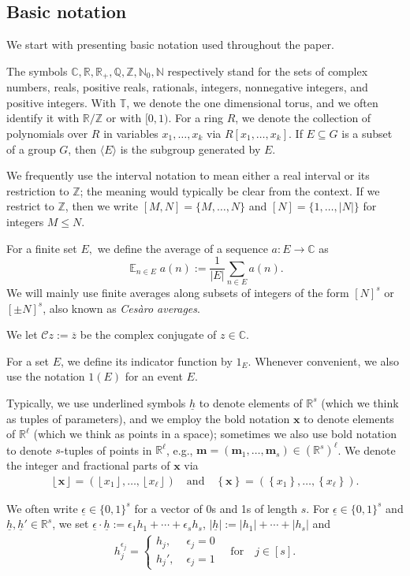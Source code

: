 \documentclass[11pt]{amsart}
\theoremstyle{definition}
\DeclareMathOperator*{\E}{\mathbb{E}}
\newcommand{\C}{{\mathbb C}}
\newcommand{\N}{{\mathbb N}}
\newcommand{\Q}{{\mathbb Q}}
\newcommand{\R}{{\mathbb R}}
\newcommand{\T}{{\mathbb T}}
\newcommand{\Z}{{\mathbb Z}}
\newcommand{\CC}{{\mathcal C}}
\newcommand{\bm}{{\mathbf{m}}}
\newcommand{\bx}{{\mathbf{x}}}
\newcommand{\uh}{{\underline{h}}}
\newcommand{\eps}{\epsilon}
\newcommand{\ueps}{{\underline{\epsilon}}}
\newcommand{\1}{{\mathbf{1}}}
\newcommand{\abs}[1]{\mathopen{}\left| #1\mathclose{}\right|}
\newcommand{\floor}[1]{{\left \lfloor #1 \right \rfloor}}
\newcommand{\rem}[1]{\left \{ #1 \right \}}
\begin{document}
\subsection{Basic notation}\label{SS:notation}
We start with presenting basic notation used throughout the paper.

The symbols $\C, \R, \R_+, \Q, \Z, \N_0, \N$ respectively stand for the sets of complex numbers, reals, positive reals, rationals, integers, nonnegative integers, and positive integers. With $\T$, we denote the one dimensional torus, and we often identify it with $\R/\Z$ or  with $[0,1)$. For a ring $R$, we denote the collection of polynomials over $R$ in variables $x_1, \ldots, x_k$ via $R[x_1, \ldots, x_k]$. If $E\subseteq G$ is a subset of a group $G$, then $\langle E \rangle$ is the subgroup generated by $E$.

We frequently use the interval notation to mean either a real interval or its restriction to $\Z$; the meaning would typically be clear from the context. If we restrict to $\Z$, then we write $[M,N] = \{M, \ldots, N\}$ and $[N]=\{1, \ldots, |N|\}$ for integers $M\leq N$.


For a finite set $E,$ we define the average of a sequence $a:E\to \C$ as 
\[\E_{n\in E}a(n) :=\frac{1}{|E|}\sum_{n\in E}a(n).\] We will mainly use finite averages along subsets of integers of the form $[N]^s$ or $[\pm N]^s$, also known as \textit{Ces\`aro averages}.

We let $\CC z := \overline{z}$ be the complex conjugate of $z\in \C$.

For a set $E$, we define its indicator function by $1_E$. Whenever convenient, we also use the notation $1(E)$ for an event $E$.


Typically, we use underlined symbols $\uh$ to denote elements of $\R^s$ (which we think as tuples of parameters), and we employ the bold notation $\bx$ to denote elements of $\R^\ell$ (which we think as points in a space); sometimes we also use bold notation to denote $s$-tuples of points in $\R^\ell$, e.g., $\bm=(\bm_1, \ldots, \bm_s)\in(\R^s)^\ell$. We denote the integer and fractional parts of $\bx$ via
\begin{align*}
    \floor{\bx} = (\floor{x_1}, \ldots, \floor{x_\ell})\quad \textrm{and}\quad \rem{\bx} =(\rem{x_1}, \ldots, \rem{x_\ell}).
\end{align*}

We often write $\ueps\in\{0,1\}^s$ for a vector of 0s and 1s of length $s$. For $\ueps\in\{0,1\}^s$ and $\uh, \uh'\in\R^s$, we set $\ueps\cdot \uh:=\eps_1 h_1+\cdots+ \eps_s h_s$, $\abs{\uh} := |h_1|+\cdots+|h_s|$ and
\begin{gather}\label{E: h^eps}
    h_j^{\eps_j} =\begin{cases}
        h_j,\; &\eps_j =0\\
        h_j',\; &\eps_j = 1
    \end{cases}
    \quad \textrm{for}\quad j\in[s].
\end{gather}
\end{document}
